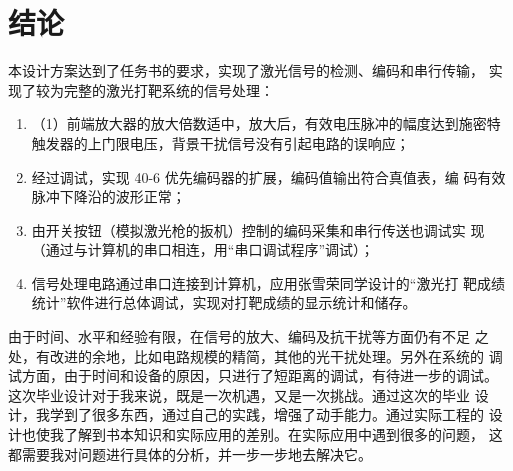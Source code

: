 \chapter{结论}

本设计方案达到了任务书的要求，实现了激光信号的检测、编码和串行传输，
实现了较为完整的激光打靶系统的信号处理：
\begin{enumerate}
  \item （1）前端放大器的放大倍数适中，放大后，有效电压脉冲的幅度达到施密特
  触发器的上门限电压，背景干扰信号没有引起电路的误响应；
  \item 经过调试，实现 40-6 优先编码器的扩展，编码值输出符合真值表，编
  码有效脉冲下降沿的波形正常；
  \item 由开关按钮（模拟激光枪的扳机）控制的编码采集和串行传送也调试实
  现（通过与计算机的串口相连，用``串口调试程序''调试）；
  \item 信号处理电路通过串口连接到计算机，应用张雪荣同学设计的“激光打
  靶成绩统计”软件进行总体调试，实现对打靶成绩的显示统计和储存。
\end{enumerate}

由于时间、水平和经验有限，在信号的放大、编码及抗干扰等方面仍有不足
之处，有改进的余地，比如电路规模的精简，其他的光干扰处理。另外在系统的
调试方面，由于时间和设备的原因，只进行了短距离的调试，有待进一步的调试。
这次毕业设计对于我来说，既是一次机遇，又是一次挑战。通过这次的毕业
设计，我学到了很多东西，通过自己的实践，增强了动手能力。通过实际工程的
设计也使我了解到书本知识和实际应用的差别。在实际应用中遇到很多的问题，
这都需要我对问题进行具体的分析，并一步一步地去解决它。